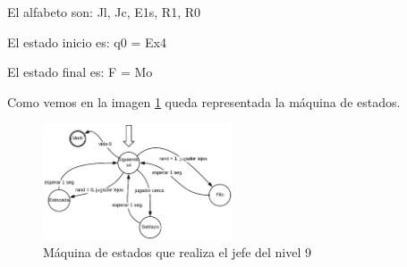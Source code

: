 El alfabeto son:
{Jl, Jc, E1s, R1, R0}

El estado inicio es:
q0 = {Ex4}

El estado final es:
F = {Mo}


Como vemos en la imagen \ref{fig:maqN9} queda representada la máquina de estados.
\begin{figure}
	\centering
	\caption{Máquina de estados que realiza el jefe del nivel 9}
	\label{fig:maqN9}
	\includegraphics[width=0.5\textwidth]{02Antecedentes/ajustesR/imagenes/N9}
\end{figure}